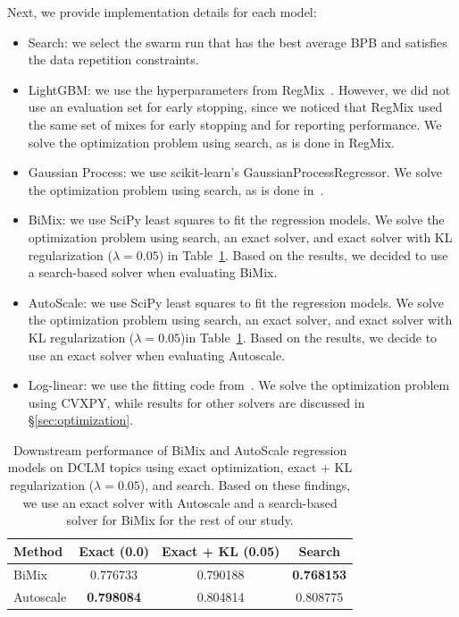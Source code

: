 Next, we provide implementation details for each model:
\begin{itemize}
    \item Search: we select the swarm run that has the best average BPB and satisfies the data repetition constraints.
    \item LightGBM: we use the hyperparameters from RegMix~\citep{liu2025regmixdatamixtureregression}. However, we did not use an evaluation set for early stopping, since we noticed that RegMix used the same set of mixes for early stopping and for reporting performance. We solve the optimization problem using search, as is done in RegMix.
    \item Gaussian Process: we use scikit-learn's GaussianProcessRegressor. We solve the optimization problem using search, as is done in~\citet{chen2025admirebayesoptaccelerateddatamixture}.
    \item BiMix: we use SciPy least squares to fit the regression models. We solve the optimization problem using search, an exact solver, and exact solver with KL regularization ($\lambda = 0.05$) in Table~\ref{tab:bimix_autoscale_solvers}. Based on the results, we decided to use a search-based solver when evaluating BiMix.
    \item AutoScale: we use SciPy least squares to fit the regression models. We solve the optimization problem using search, an exact solver, and exact solver with KL regularization ($\lambda = 0.05$)in Table~\ref{tab:bimix_autoscale_solvers}. Based on the results, we decide to use an exact solver when evaluating Autoscale.
    \item Log-linear: we use the fitting code from~\citet{ye2025datamixinglawsoptimizing}. We solve the optimization problem using CVXPY, while results for other solvers are discussed in \S\ref{sec:optimization}.
\end{itemize}

\begin{table}[t]
\centering
\small
\caption{Downstream performance of BiMix and AutoScale regression models on DCLM topics using exact optimization, exact + KL regularization ($\lambda = 0.05$), and search. Based on these findings, we use an exact solver with Autoscale and a search-based solver for BiMix for the rest of our study.}
\begin{tabular}{lccc}
\toprule
\textbf{Method} & \textbf{Exact (0.0)} & \textbf{Exact + KL (0.05)} & \textbf{Search} \\
\midrule
BiMix      & 0.776733 & 0.790188 & \textbf{0.768153} \\
Autoscale  & \textbf{0.798084} & 0.804814 & 0.808775 \\
\bottomrule
\end{tabular}
\label{tab:bimix_autoscale_solvers}
\end{table}





